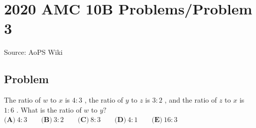 \documentclass[12pt]{article}
\begin{document}
\section*{{2020 AMC 10B Problems/Problem 3}}
Source: AoPS Wiki

\subsection*{Problem}
The ratio of $w$ to $x$ is $4:3$ , the ratio of $y$ to $z$ is $3:2$ , and the ratio of $z$ to $x$ is $1:6$ . What is the ratio of $w$ to $y?$ $\textbf{(A)}\ 4:3 \qquad\textbf{(B)}\ 3:2 \qquad\textbf{(C)}\ 8:3 \qquad\textbf{(D)}\ 4:1 \qquad\textbf{(E)}\ 16:3$
\end{document}
